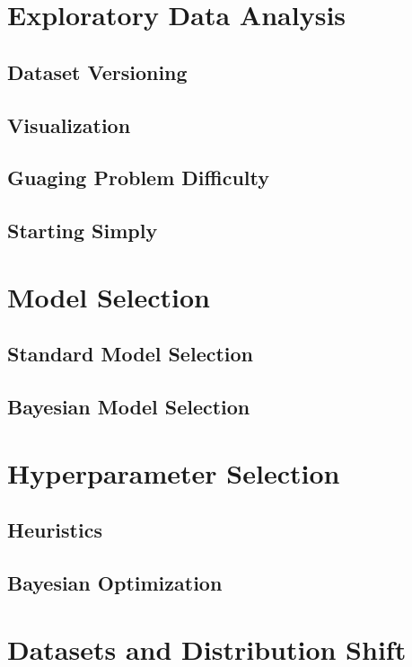 \documentclass[10pt]{article}
\begin{document}
\section{Exploratory Data Analysis}

\subsection{Dataset Versioning}

\subsection{Visualization}

\subsection{Guaging Problem Difficulty}

\subsection{Starting Simply}

\section{Model Selection}

\subsection{Standard Model Selection}

\subsection{Bayesian Model Selection}

\section{Hyperparameter Selection}

\subsection{Heuristics}

\subsection{Bayesian Optimization}

\section{Datasets and Distribution Shift}
\end{document}
